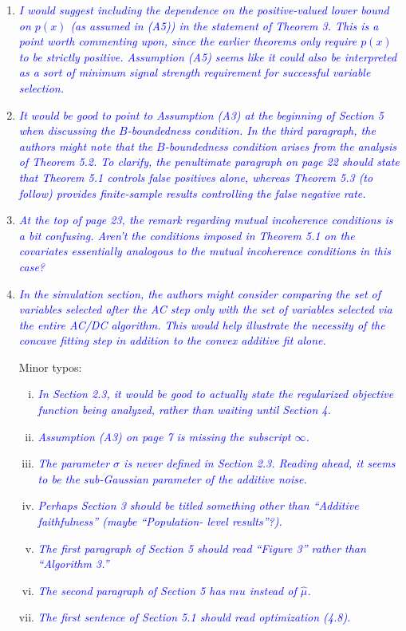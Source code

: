 \documentclass[pdftex,12pt]{article}
\let\hat\widehat
\def\rc#1{{\it\textcolor{blue}{#1}}\smallskip}
\begin{document}
\begin{enumerate}[(1)]
\item \rc{I would suggest including the dependence on the positive-valued lower
bound on $p(x)$ (as assumed in (A5)) in the statement of Theorem 3. This
is a point worth commenting upon, since the earlier theorems only
require $p(x)$ to be strictly positive. Assumption (A5) seems like it
could also be interpreted as a sort of minimum signal strength
requirement for successful variable selection.}

\item \rc{It would be good to point to Assumption (A3) at the beginning of
Section 5 when discussing the $B$-boundedness condition. In the third
paragraph, the authors might note that the $B$-boundedness condition
arises from the analysis of Theorem 5.2. To clarify, the penultimate
paragraph on page 22 should state that Theorem 5.1 controls false
positives alone, whereas Theorem 5.3 (to follow) provides
finite-sample results controlling the false negative rate.}

\item \rc{At the top
of page 23, the remark regarding mutual incoherence conditions is a
bit confusing. Aren’t the conditions imposed in Theorem 5.1 on the
covariates essentially analogous to the mutual incoherence conditions
in this case? }

\item \rc{In the simulation section, the authors might consider comparing the
set of variables selected after the AC step only with the set of
variables selected via the entire AC/DC algorithm. This would help
illustrate the necessity of the concave fitting step in addition to
the convex additive fit alone.}

Minor typos:
\begin{enumerate}[(i)]
\item \rc{In Section 2.3, it would be good to actually state the regularized
objective function being analyzed, rather than waiting until Section
4.}
\item \rc{Assumption (A3) on page 7 is missing the subscript $\infty$.}
\item \rc{The parameter $\sigma$ is never defined in Section 2.3. Reading ahead,
it seems to be the sub-Gaussian parameter of the additive noise.}
\item \rc{Perhaps Section 3 should be titled something other than ``Additive
faithfulness'' (maybe ``Population- level results''?).}
\item \rc{The first paragraph of Section 5 should read
  ``Figure 3'' rather than ``Algorithm 3.''}

\item \rc{The second paragraph of Section 5 has $m\hat{}u$ instead of $\hat\mu$.}
\item \rc{The first sentence of Section 5.1 should read optimization (4.8).}
\end{enumerate}

\end{enumerate}
\end{document}
